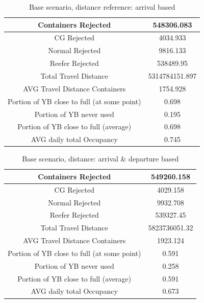\documentclass{article}
\begin{document}
\begin{table}[h]
    \centering
    \begin{tabular}{|c|c|}
        \hline
        Containers Rejected                         & 548306.083     \\ \hline
        CG Rejected                                 & 4034.933       \\ \hline
        Normal Rejected                             & 9816.133       \\ \hline
        Reefer Rejected                             & 538489.95      \\ \hline
        Total Travel Distance                       & 5314784151.897 \\ \hline
        AVG Travel Distance Containers              & 1754.928       \\ \hline
        Portion of YB close to full (at some point) & 0.698          \\ \hline
        Portion of YB never used                    & 0.195          \\ \hline
        Portion of YB close to full (average)       & 0.698          \\ \hline
        AVG daily total Occupancy                   & 0.745          \\ \hline
    \end{tabular}
    \caption{Base scenario, distance reference: arrival based}
    \label{tab:Base_arival}
\end{table}
\begin{table}[h]
    \centering
    \begin{tabular}{|c|c|}
        \hline
        Containers Rejected                         & 549260.158    \\ \hline
        CG Rejected                                 & 4029.158      \\ \hline
        Normal Rejected                             & 9932.708      \\ \hline
        Reefer Rejected                             & 539327.45     \\ \hline
        Total Travel Distance                       & 5823736051.32 \\ \hline
        AVG Travel Distance Containers              & 1923.124      \\ \hline
        Portion of YB close to full (at some point) & 0.591         \\ \hline
        Portion of YB never used                    & 0.258         \\ \hline
        Portion of YB close to full (average)       & 0.591         \\ \hline
        AVG daily total Occupancy                   & 0.673         \\ \hline
    \end{tabular}
    \caption{Base scenario, distance: arrival \& departure based}
    \label{tab:Base_departure_arrival}
\end{table}
\end{document}
